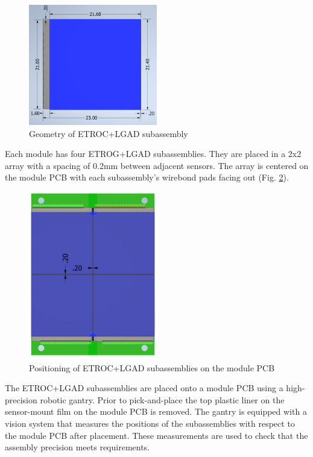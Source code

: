 \documentclass[10pt]{datasheet}
\begin{document}
\begin{figure}[h]
	\centering
    \includegraphics[width=0.5\textwidth]{figures/ETROCpLGAD.png}
    \caption{Geometry of ETROC+LGAD subassembly}
    \label{fig:bbm-geometry}	
\end{figure}

Each module has four ETROG+LGAD subassemblies. They are placed in a 2x2 array with a spacing of 0.2mm between adjacent sensors. The array is centered on the module PCB with each subassembly's wirebond pads facing out (Fig. \ref{fig:mod-with-bbms}).

\begin{figure}[h]
	\centering
	\includegraphics[width=0.5\textwidth,angle=90]{figures/module-with-bbms.png}
	\caption{Positioning of ETROC+LGAD subassemblies on the module PCB}
	\label{fig:mod-with-bbms}	
\end{figure}

The ETROC+LGAD subassemblies are placed onto a module PCB using a high-precision robotic gantry. Prior to pick-and-place the top plastic liner on the sensor-mount film on the module PCB is removed. The gantry is equipped with a vision system that measures the positions of the subassemblies with respect to the module PCB after placement. These measurements are used to check that the assembly precision meets requirements.
\end{document}
